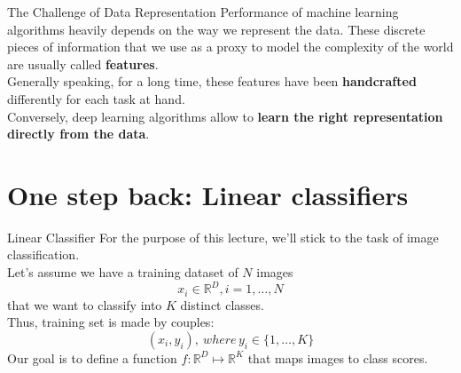 \documentclass[aspectratio=169]{beamer}
\newcommand{\R}{\mathbb{R}}
\begin{document}
\begin{frame}{The Challenge of Data Representation}
Performance of machine learning algorithms heavily depends on the way we represent the data. These discrete pieces of information that we use as a proxy to model the complexity of the world are usually called \textbf{features}.\\
\vspace{0.5cm}
Generally speaking, for a long time, these features have been \textbf{handcrafted} differently for each task at hand.\\
\vspace{0.5cm}
Conversely, deep learning algorithms allow to \textbf{learn the right representation directly from the data}.
\end{frame}


\section{One step back: Linear classifiers}

\begin{frame}{Linear Classifier}
For the purpose of this lecture, we'll stick to the task of image classification.\\
Let's assume we have a training dataset of $N$ images
\begin{equation*}
x_i \in \R^D, i = 1, \dots, N
\end{equation*}
that we want to classify into $K$ distinct classes.\\
Thus, training set is made by couples:
\begin{equation*}
(x_i, y_i),\ where \, y_i \in \{1, \dots, K\}
\end{equation*}
Our goal is to define a function $f: \R^D \mapsto \R^K$ that maps images to class scores.
\end{frame}

\end{document}

